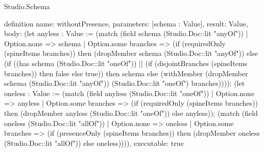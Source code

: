 \begin{lexlean}{Studio.Schema}
\begin{semanticmodule}
definition{
  name: withoutPresence,
  parameters: [schema : Value],
  result: Value,
  body: (let anyless : Value := (match (field schema (Studio.Doc::lit "anyOf"))
    | Option.none => schema
    | Option.some branches => (if (requiredOnly (spineItems branches)) then (dropMember schema (Studio.Doc::lit "anyOf")) else (if ((has schema (Studio.Doc::lit "oneOf")) || (if (disjointBranches (spineItems branches)) then false else true)) then schema else (withMember (dropMember schema (Studio.Doc::lit "anyOf")) (Studio.Doc::lit "oneOf") branches)))); (let oneless : Value := (match (field anyless (Studio.Doc::lit "oneOf"))
    | Option.none => anyless
    | Option.some branches => (if (requiredOnly (spineItems branches)) then (dropMember anyless (Studio.Doc::lit "oneOf")) else anyless)); (match (field oneless (Studio.Doc::lit "allOf"))
    | Option.none => oneless
    | Option.some branches => (if (presenceOnly (spineItems branches)) then (dropMember oneless (Studio.Doc::lit "allOf")) else oneless)))),
  executable: true
}


\end{semanticmodule}
\end{lexlean}

